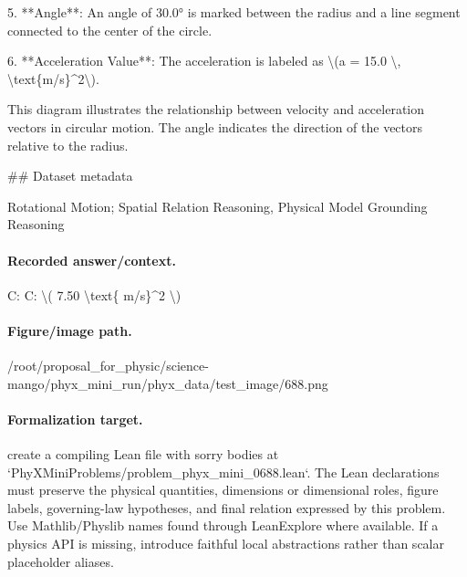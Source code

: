 5. **Angle**: An angle of 30.0° is marked between the radius and a line segment connected to the center of the circle.

6. **Acceleration Value**: The acceleration is labeled as \textbackslash{}(a = 15.0 \textbackslash{}, \textbackslash{}text\{m/s\}\textasciicircum{}2\textbackslash{}).

This diagram illustrates the relationship between velocity and acceleration vectors in circular motion. The angle indicates the direction of the vectors relative to the radius.

\#\# Dataset metadata

Rotational Motion; Spatial Relation Reasoning, Physical Model Grounding Reasoning

\paragraph{Recorded answer/context.}
C: C: \textbackslash{}( 7.50 \textbackslash{}text\{ m/s\}\textasciicircum{}2 \textbackslash{})

\paragraph{Figure/image path.}
/root/proposal\_for\_physic/science-mango/phyx\_mini\_run/phyx\_data/test\_image/688.png

\paragraph{Formalization target.}
create a compiling Lean file with sorry bodies at `PhyXMiniProblems/problem\_phyx\_mini\_0688.lean`. The Lean declarations must preserve the physical quantities, dimensions or dimensional roles, figure labels, governing-law hypotheses, and final relation expressed by this problem.
Use Mathlib/Physlib names found through LeanExplore where available. If a physics API is missing, introduce faithful local abstractions rather than scalar placeholder aliases.

